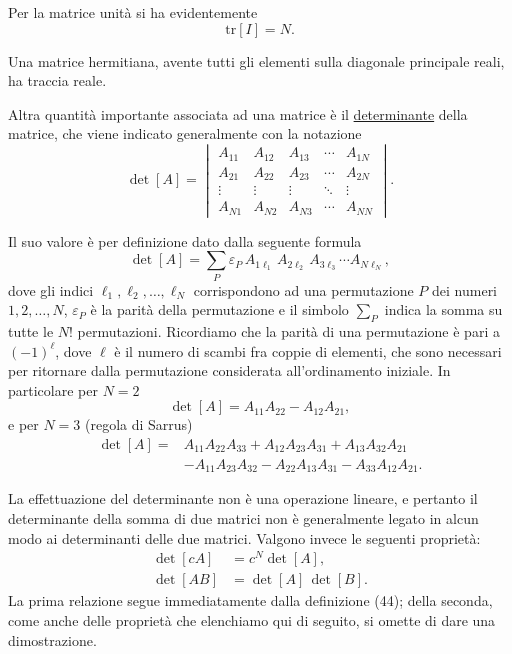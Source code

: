 \documentclass[11pt, a4paper]{book}
\numberwithin{equation}{section}
\begin{document}
Per la matrice unità si ha evidentemente
\begin{equation}
    \mathrm{tr}[I] = N.
    \tag{43}
\end{equation}

Una matrice hermitiana, avente tutti gli elementi sulla diagonale principale reali, ha traccia reale.

Altra quantità importante associata ad una matrice è il \underline{determinante} della matrice, che viene indicato generalmente con la notazione
\[
\det[A] =
\begin{vmatrix}
A_{11} & A_{12} & A_{13} & \cdots & A_{1N} \\
A_{21} & A_{22} & A_{23} & \cdots & A_{2N} \\
\vdots & \vdots & \vdots & \ddots & \vdots \\
A_{N1} & A_{N2} & A_{N3} & \cdots & A_{NN}
\end{vmatrix}.
\]

Il suo valore è per definizione dato dalla seguente formula
\begin{equation}
    \det[A] = \sum_{P} \varepsilon_P\, A_{1\ell_1}\, A_{2\ell_2}\, A_{3\ell_3} \cdots A_{N\ell_N},
    \tag{44}
\end{equation}
dove gli indici $\ell_1, \ell_2, \ldots, \ell_N$ corrispondono ad una permutazione $P$ dei numeri $1, 2, \ldots, N$, $\varepsilon_P$ è la parità della permutazione e il simbolo $\sum_P$ indica la somma su tutte le $N!$ permutazioni. Ricordiamo che la parità di una permutazione è pari a $(-1)^\ell$, dove $\ell$ è il numero di scambi fra coppie di elementi, che sono necessari per ritornare dalla permutazione considerata all'ordinamento iniziale. In particolare per $N = 2$
\begin{equation}
    \det[A] = A_{11} A_{22} - A_{12} A_{21},
    \tag{45}
\end{equation}
e per $N = 3$ (regola di Sarrus)
\begin{equation}
\begin{aligned}
    \det[A] = {}&A_{11} A_{22} A_{33} + A_{12} A_{23} A_{31} + A_{13} A_{32} A_{21} \\
               &- A_{11} A_{23} A_{32} - A_{22} A_{13} A_{31} - A_{33} A_{12} A_{21}.
\end{aligned}
    \tag{46}
\end{equation}

La effettuazione del determinante non è una operazione lineare, e pertanto il determinante della somma di due matrici non è generalmente legato in alcun modo ai determinanti delle due matrici. Valgono invece le seguenti proprietà:
\begin{align}
    \det[c A] &= c^N \det[A],
    \tag{46b} \\
    \det[AB] &= \det[A]\, \det[B].
    \tag{47}
\end{align}
La prima relazione segue immediatamente dalla definizione (44); della seconda, come anche delle proprietà che elenchiamo qui di seguito, si omette di dare una dimostrazione.
\end{document}
